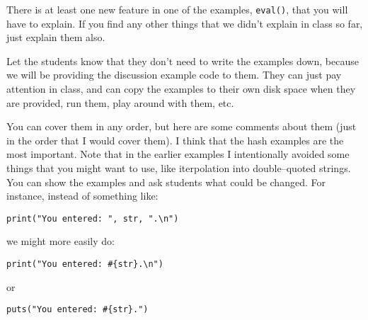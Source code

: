 \documentclass[12pt]{article}
\begin{document}
      There is at least one new feature in one of the examples,
    \texttt{eval()}, that you will have to explain.  If you find any other
    things that we didn't explain in class so far, just explain them also.

      Let the students know that they don't need to write the examples down,
    because we will be providing the discussion example code to them.  They
    can just pay attention in class, and can copy the examples to their own
    disk space when they are provided, run them, play around with them, etc.

      You can cover them in any order, but here are some comments about them
    (just in the order that I would cover them).  I think that the hash
    examples are the most important.  Note that in the earlier examples I
    intentionally avoided some things that you might want to use, like
    iterpolation into double--quoted strings.  You can show the examples and
    ask students what could be changed.  For instance, instead of something
    like:

      \begin{Verbatim}[gobble=6]
      print("You entered: ", str, ".\n")
      \end{Verbatim}

      \noindent
      we might more easily do:

      \begin{Verbatim}[gobble=6]
      print("You entered: #{str}.\n")
      \end{Verbatim}

      \noindent
      or

      \begin{Verbatim}[gobble=6]
      puts("You entered: #{str}.")
      \end{Verbatim}

      \vspace{-2.5mm}
\end{document}
